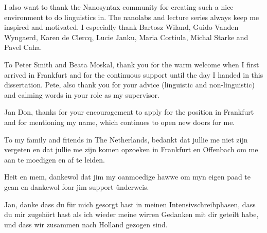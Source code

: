 I also want to thank the Nanosyntax community for creating such a nice environment to do linguistics in.
The nanolabs and lecture series always keep me inspired and motivated.
I especially thank
Bartosz Wiland,
Guido Vanden Wyngaerd,
Karen de Clercq,
Lucie Janku,
Maria Cortiula,
Michal Starke and
Pavel Caha.

To Peter Smith and Beata Moskal,
thank you for the warm welcome when I first arrived in Frankfurt and for the continuous support until the day I handed in this dissertation.
Pete, also thank you for your advice (linguistic and non-linguistic) and calming words in your role as my supervisor.

Jan Don, thanks for your encouragement to apply for the position in Frankfurt and for mentioning my name, which continues to open new doors for me.

To my family and friends in The Netherlands, bedankt dat jullie me niet zijn vergeten en dat jullie me zijn komen opzoeken in Frankfurt en Offenbach om me aan te moedigen en af te leiden.

Heit en mem, dankewol dat jim my oanmoedige hawwe om myn eigen paad te gean en dankewol foar jim support ûnderweis.

Jan, danke dass du für mich gesorgt hast in meinen Intensivschreibphasen,
dass du mir zugehört hast als ich wieder meine wirren Gedanken mit dir geteilt habe,
und dass wir zusammen nach Holland gezogen sind.
